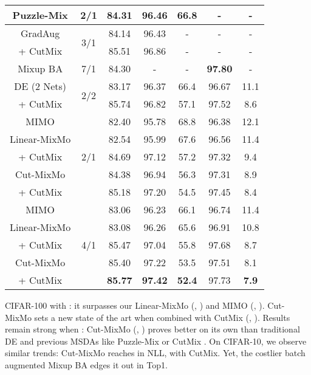 \documentclass[10pt,twocolumn,letterpaper]{article}
\begin{document}
\begin{table}[!t]
{\begin{tabular}{c | c | c c c | c c}
            \midrule
            Puzzle-Mix & 2/1 & 84.31 & 96.46 & 66.8 &-&-\\
            \midrule
            GradAug & \multirow{2}{*}{3/1} & 84.14 & 96.43 & - & -&- \\
            + CutMix & & 85.51 & 96.86 & - &- & - \\
            \midrule
Mixup BA & 7/1 & 84.30 & - & - & \textbf{97.80} &- \\
            \midrule
            DE (2 Nets) & \multirow{2}{*}{2/2} & 83.17 & 96.37 & 66.4 & 96.67 & 11.1 \\
            + CutMix & & 85.74 & 96.82 & 57.1 & 97.52 & 8.6 \\
            \midrule
            \midrule
            \multirow{1}{*}{MIMO} & \multirow{5}{*}{2/1} & 82.40 & 95.78 & 68.8 & 96.38 & 12.1 \\
            \cmidrule{1-1}
            \cmidrule{3-7}
            \multirow{1}{*}{Linear-MixMo} & & 82.54 & 95.99 & 67.6 & 96.56 & 11.4 \\
            + CutMix & & 84.69 & 97.12 & 57.2 &  97.32 & 9.4 \\
            \cmidrule{1-1}
            \cmidrule{3-7}
            \multirow{1}{*}{Cut-MixMo} & & 84.38 & 96.94 & 56.3 & 97.31 & 8.9 \\
            + CutMix & & 85.18 & 97.20 & 54.5 & 97.45 & 8.4 \\
\midrule
            \multirow{1}{*}{MIMO} & \multirow{5}{*}{4/1} & 83.06 & 96.23 & 66.1 & 96.74 & 11.4 \\
            \cmidrule{1-1}
            \cmidrule{3-7}
            \multirow{1}{*}{Linear-MixMo} & & 83.08 & 96.26 & 65.6 & 96.91 & 10.8 \\
            + CutMix & & 85.47 & 97.04 & 55.8 & 97.68 & 8.7 \\
            \cmidrule{1-1}
            \cmidrule{3-7}
            \multirow{1}{*}{Cut-MixMo} &  & 85.40 & 97.22 & 53.5 & 97.51 & 8.1 \\
            + CutMix & & \textbf{85.77} & \textbf{97.42} & \textbf{52.4} & 97.73 & \textbf{7.9} \\
            \bottomrule \end{tabular}}\label{table:cifar10010}\vspace{-0.2em}\end{table}%
CIFAR-100 with : it surpasses our Linear-MixMo (, ) and MIMO (, ). Cut-MixMo sets a new state of the art when combined with CutMix (, ).
Results remain strong when : Cut-MixMo (, ) proves better on its own than traditional DE \cite{lakshminarayanan2016simple} and previous MSDAs like Puzzle-Mix \cite{kim2020puzzle} or CutMix \cite{yun2019cutmix}.
On CIFAR-10, we observe similar trends: Cut-MixMo reaches  in NLL,  with CutMix. Yet, the costlier batch augmented Mixup BA \cite{Hoffer_2020_CVPR} edges it out in Top1.
\end{document}
